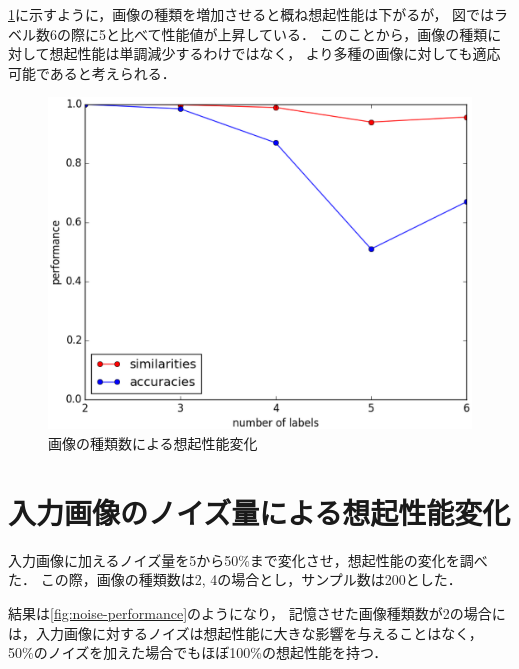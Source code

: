 \documentclass[10pt,twocolumn]{jarticle}
\newcommand{\figref}[1]{\figurename\ref{fig:#1}}
\begin{document}
\figref{labels-performance}に示すように，画像の種類を増加させると概ね想起性能は下がるが，
図ではラベル数6の際に5と比べて性能値が上昇している．
このことから，画像の種類に対して想起性能は単調減少するわけではなく，
より多種の画像に対しても適応可能であると考えられる．
\begin{figure}[hbtp]
  \centering
    \includegraphics[width=\columnwidth]{figs/labels_performance}
    \caption{画像の種類数による想起性能変化}
    \label{fig:labels-performance}
\end{figure}


\section{入力画像のノイズ量による想起性能変化}
入力画像に加えるノイズ量を5から50\%まで変化させ，想起性能の変化を調べた．
この際，画像の種類数は2, 4の場合とし，サンプル数は200とした．

結果は\figref{noise-performance}のようになり，
記憶させた画像種類数が2の場合には，入力画像に対するノイズは想起性能に大きな影響を与えることはなく，
50\%のノイズを加えた場合でもほぼ100\%の想起性能を持つ．
\end{document}

